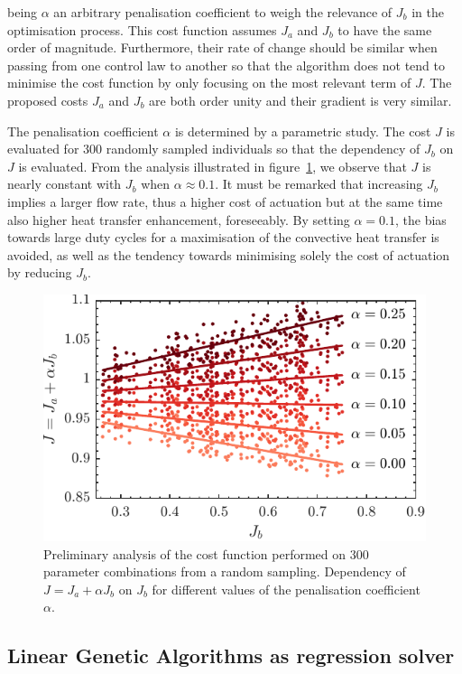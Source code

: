 being $\alpha$ an arbitrary penalisation coefficient to weigh the relevance of $J_b$ in the optimisation process. This cost function assumes $J_a$ and $J_b$ to have the same order of magnitude. Furthermore, their rate of change should be similar when passing from one control law to another so that the algorithm does not tend to minimise the cost function by only focusing on the most relevant term of $J$. The proposed costs $J_a$ and $J_b$ are both order unity and their gradient is very similar.

The penalisation coefficient $\alpha$ is determined by a parametric study. The cost $J$ is evaluated for $300$ randomly sampled individuals so that the dependency of $J_b$ on $J$ is evaluated. From the analysis illustrated in figure~\ref{fig:alpha}, we observe that $J$ is nearly constant with $J_b$ when $\alpha\approx 0.1$. It must be remarked that increasing $J_b$ implies a larger flow rate, thus a higher cost of actuation but at the same time also higher heat transfer enhancement, foreseeably. By setting $\alpha = 0.1$, the bias towards large duty cycles for a maximisation of the convective heat transfer is avoided, as well as the tendency towards minimising solely the cost of actuation by reducing $J_b$.

\begin{figure}[]
\centering
    \includegraphics[width=0.7\linewidth]{figures/F4.pdf}
\caption{\label{fig:alpha} Preliminary analysis of the cost function performed on $300$ parameter combinations from a random sampling. Dependency of $J=J_a+\alpha J_b$ on $J_b$ for different values of the penalisation coefficient $\alpha$.} 
\end{figure}

\subsection{Linear Genetic Algorithms as regression solver} \label{ss:lgac}

